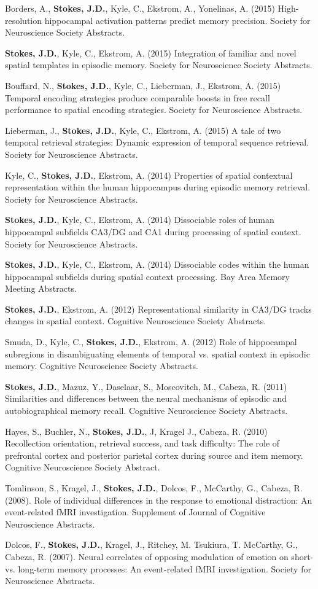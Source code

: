 \documentclass[line,margin,10pt]{res}
\begin{document}
\begin{resume}
Borders, A., \textbf{Stokes, J.D.}, Kyle, C., Ekstrom, A., Yonelinas, A. (2015) High-resolution hippocampal activation patterns predict memory precision. Society for Neuroscience Society Abstracts.

\textbf{Stokes, J.D.}, Kyle, C., Ekstrom, A. (2015) Integration of familiar and novel spatial templates in episodic memory. Society for Neuroscience Society Abstracts.

Bouffard, N., \textbf{Stokes, J.D.}, Kyle, C., Lieberman, J., Ekstrom, A. (2015) Temporal encoding strategies produce comparable boosts in free recall performance to spatial encoding strategies. Society for Neuroscience Abstracts.

Lieberman, J., \textbf{Stokes, J.D.}, Kyle, C., Ekstrom, A. (2015) A tale of two temporal retrieval strategies: Dynamic expression of temporal sequence retrieval. Society for Neuroscience Abstracts.

Kyle, C., \textbf{Stokes, J.D.}, Ekstrom, A. (2014) Properties of spatial contextual representation within the human hippocampus during episodic memory retrieval. Society for Neuroscience Abstracts.

\textbf{Stokes, J.D.}, Kyle, C., Ekstrom, A. (2014) Dissociable roles of human hippocampal subfields CA3/DG and CA1 during processing of spatial context. Society for Neuroscience Abstracts.

\textbf{Stokes, J.D.}, Kyle, C., Ekstrom, A. (2014) Dissociable codes within the human hippocampal subfields during spatial context processing. Bay Area Memory Meeting Abstracts.

\textbf{Stokes, J.D.}, Ekstrom, A. (2012) Representational similarity in CA3/DG tracks changes in spatial context. Cognitive Neuroscience Society Abstracts.
 	
Smuda, D., Kyle, C., \textbf{Stokes, J.D.}, Ekstrom, A. (2012) Role of hippocampal subregions in disambiguating elements of temporal vs. spatial context in episodic memory. Cognitive Neuroscience Society Abstracts.
 	
\textbf{Stokes, J.D.}, Mazuz, Y., Daselaar, S., Moscovitch, M., Cabeza, R. (2011) Similarities and differences between the neural mechanisms of episodic and autobiographical memory recall. Cognitive Neuroscience Society Abstracts.
 	
Hayes, S., Buchler, N., \textbf{Stokes, J.D.}, J, Kragel J.,  Cabeza, R. (2010) Recollection orientation, retrieval success, and task difficulty: The role of prefrontal cortex and posterior parietal cortex during source and item memory. Cognitive Neuroscience Society Abstract.
 	
Tomlinson, S., Kragel, J., \textbf{Stokes, J.D.}, Dolcos, F., McCarthy, G., Cabeza, R. (2008). Role of individual differences in the response to emotional distraction: An event-related fMRI investigation. Supplement of Journal of Cognitive Neuroscience Abstracts.
 	
Dolcos, F., \textbf{Stokes, J.D.}, Kragel, J., Ritchey, M. Tsukiura, T. McCarthy, G., Cabeza, R. (2007). Neural correlates of opposing modulation of emotion on short- vs. long-term memory processes: An event-related fMRI investigation. Society for Neuroscience Abstracts.

\end{resume}
\end{document}
